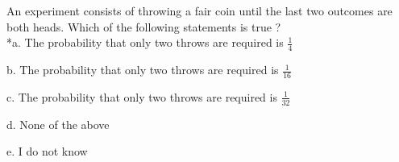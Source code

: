 
An experiment consists of throwing a fair coin until the last two
outcomes are both heads. Which of the following statements is true ? \\

*a. The probability that only two throws are required is \(\frac{1}{4}\)

b. The probability that only two throws are required is \(\frac{1}{16}\)

c. The probability that only two throws are required is \(\frac{1}{32}\)

d. None of the above

e. I do not know \\
